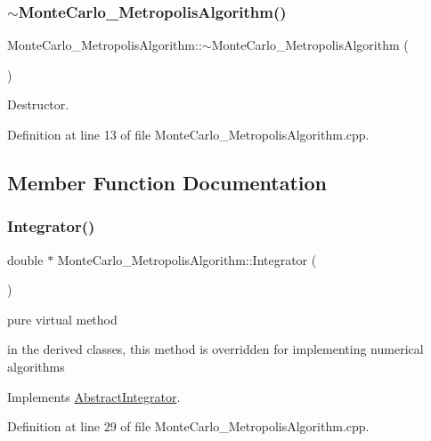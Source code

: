 \subsubsection{\texorpdfstring{$\sim$\+Monte\+Carlo\+\_\+\+Metropolis\+Algorithm()}{~MonteCarlo\_MetropolisAlgorithm()}}
{\footnotesize\ttfamily Monte\+Carlo\+\_\+\+Metropolis\+Algorithm\+::$\sim$\+Monte\+Carlo\+\_\+\+Metropolis\+Algorithm (\begin{DoxyParamCaption}{ }\end{DoxyParamCaption})}



Destructor. 



Definition at line 13 of file Monte\+Carlo\+\_\+\+Metropolis\+Algorithm.\+cpp.



\subsection{Member Function Documentation}
\mbox{\label{class_monte_carlo___metropolis_algorithm_a93fba72a50330bf184156e23158992b2}} 
\subsubsection{\texorpdfstring{Integrator()}{Integrator()}}
{\footnotesize\ttfamily double $\ast$ Monte\+Carlo\+\_\+\+Metropolis\+Algorithm\+::\+Integrator (\begin{DoxyParamCaption}{ }\end{DoxyParamCaption})\hspace{0.3cm}{\ttfamily [virtual]}}



pure virtual method 

in the derived classes, this method is overridden for implementing numerical algorithms 

Implements \hyperlink{class_abstract_integrator_a073d8f87239f732b3d2832070caa3b17}{Abstract\+Integrator}.



Definition at line 29 of file Monte\+Carlo\+\_\+\+Metropolis\+Algorithm.\+cpp.

